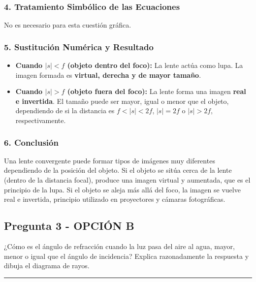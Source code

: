 \subsubsection*{4. Tratamiento Simbólico de las Ecuaciones}
No es necesario para esta cuestión gráfica.

\subsubsection*{5. Sustitución Numérica y Resultado}
\begin{cajaresultado}
\begin{itemize}
    \item \textbf{Cuando $|s|<f$ (objeto dentro del foco):} La lente actúa como lupa. La imagen formada es \textbf{virtual, derecha y de mayor tamaño}.
    \item \textbf{Cuando $|s|>f$ (objeto fuera del foco):} La lente forma una imagen \textbf{real e invertida}. El tamaño puede ser mayor, igual o menor que el objeto, dependiendo de si la distancia es $f<|s|<2f$, $|s|=2f$ o $|s|>2f$, respectivamente.
\end{itemize}
\end{cajaresultado}

\subsubsection*{6. Conclusión}
\begin{cajaconclusion}
Una lente convergente puede formar tipos de imágenes muy diferentes dependiendo de la posición del objeto. Si el objeto se sitúa cerca de la lente (dentro de la distancia focal), produce una imagen virtual y aumentada, que es el principio de la lupa. Si el objeto se aleja más allá del foco, la imagen se vuelve real e invertida, principio utilizado en proyectores y cámaras fotográficas.
\end{cajaconclusion}

\newpage

\subsection{Pregunta 3 - OPCIÓN B}
\label{subsec:3B_2006_sep}

\begin{cajaenunciado}
¿Cómo es el ángulo de refracción cuando la luz pasa del aire al agua, mayor, menor o igual que el ángulo de incidencia? Explica razonadamente la respuesta y dibuja el diagrama de rayos. 
\end{cajaenunciado}
\hrule

